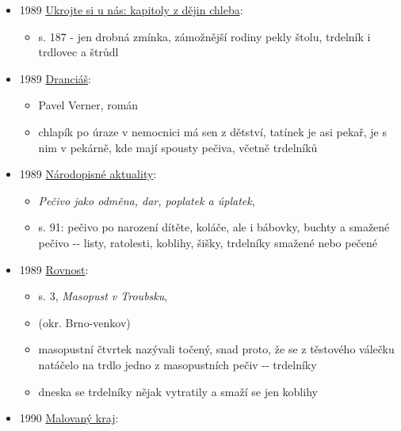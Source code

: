 \begin{itemize}
  \begin{itemize}
  \tightlist
  \item
    krátký historky o různých vědcích a umělcích
  \item
    s. 135: petrograf a mineralog profesor Alexandr Orlov byl labužník,
    vyhledával recepty z naší i zahraniční kuchyně, znal i recepty málo
    známých a lidových pokrmů
  \item
    pekl třeba buriášky, řepánky, mrkvance, peciválky, trdelníky
  \end{itemize}
\item
  1989
  \href{https://ceskadigitalniknihovna.cz/uuid/uuid:139c9470-ad04-11e3-9d7d-005056827e51}{Ukrojte
  si u nás: kapitoly z dějin chleba}:

  \begin{itemize}
  \tightlist
  \item
    s. 187 - jen drobná zmínka, zámožnější rodiny pekly štolu, trdelník
    i trdlovec a štrůdl
  \end{itemize}
\item
  1989
  \href{https://ceskadigitalniknihovna.cz/uuid/uuid:5da1a820-f9d2-11e2-9923-005056827e52}{Dranciáš}:

  \begin{itemize}
  \tightlist
  \item
    Pavel Verner, román
  \item
    chlapík po úraze v nemocnici má sen z dětství, tatínek je asi pekař,
    je s nim v pekárně, kde mají spousty pečiva, včetně trdelníků
  \end{itemize}
\item
  1989
  \href{https://www.digitalniknihovna.cz/mzk/uuid/uuid:eeeadf80-471a-11e5-8851-005056827e51}{Národopisné
  aktuality}:

  \begin{itemize}
  \tightlist
  \item
    \emph{Pečivo jako odměna, dar, poplatek a úplatek},
  \item
    s. 91: pečivo po narození dítěte, koláče, ale i bábovky, buchty a
    smažené pečivo -\/- listy, ratolesti, koblihy, šišky, trdelníky
    smažené nebo pečené
  \end{itemize}
\item
  1989
  \href{https://ndk.cz/uuid/uuid:e673a2b0-5691-11f0-b49f-5ef3fc9bb22f}{Rovnost}:

  \begin{itemize}
  \tightlist
  \item
    s. 3, \emph{Masopust v Troubsku}, 
  \item
     (okr. Brno-venkov)
  \item
    masopustní čtvrtek nazývali točený, snad proto, že se z těstového
    válečku natáčelo na trdlo jedno z masopustních pečiv -\/- trdelníky
  \item
    dneska se trdelníky nějak vytratily a smaží se jen koblihy
  \end{itemize}
\item
  1990
  \href{https://ndk.cz/uuid/uuid:78486a30-1a13-11e4-8e0d-005056827e51}{Malovaný
  kraj}:


\end{itemize}

